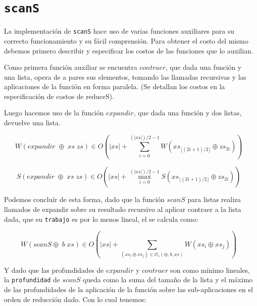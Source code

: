 \documentclass[a4paper,10pt]{article}
\begin{document}
\bigskip


\section*{\texttt{scanS}}

    La implementación de \texttt{scanS} hace uso de varias funciones auxiliares
para su correcto funcionamiento y su fácil comprensión. Para obtener el costo del
mismo debemos primero describir y especificar los costos de las funciones que lo 
auxilian.

    Como primera función auxiliar se encuentra $contraer$, que dada una función y
una lista, opera de a pares sus elementos, tomando las llamadas recursivas y las 
aplicaciones de la función en forma paralela. (Se detallan los costos en la
especificación de costos de reduceS).

\smallskip

    Luego hacemos uso de la función $expandir$, que dada una función y dos listas,
devuelve una lista. 

\begin{equation*}
    W \left( expandir \;\oplus \;xs \;zs \right) \in
    O \left( \vert xs \vert + \sum_{i=0}^{(\vert xs \vert)/2 - 1} W \left( xs_{\lfloor (2i+1)/2 \rfloor} \oplus zs_{2i} \right) \right)
\end{equation*}

\begin{equation*}
    S \left( expandir \;\oplus \;xs \;zs \right) \in
    O \left( \vert xs \vert + \max_{i=0}^{(\vert xs \vert)/2 - 1} S \left( xs_{\lfloor (2i+1)/2 \rfloor} \oplus zs_{2i} \right) \right)
\end{equation*}

\bigskip

    Podemos concluír de esta forma, dado que la función $scanS$ para listas realiza
llamados de expandir sobre su resultado recursivo al aplicar contraer a la lista
dada, que su \texttt{trabajo} es por lo menos lineal, el se calcula como:

\begin{equation*}
    W \left( scanS \oplus \; b \; xs \right) \in
    O \left( \vert xs \vert + \sum_{(xs_i \oplus xs_j) \in \mathcal{O}_s(\oplus,b,xs)} W \left( xs_i \oplus xs_j \right) \right)
\end{equation*}

    Y dado que las profundidades de $expandir$ y $contraer$ son como mínimo lineales,
la \texttt{profundidad} de $scanS$ queda como la suma del tamaño de la lista y el
máximo de las profundidades de la aplicación de la función sobre las sub-aplicaciones
en el orden de reducción dado. Con lo cual tenemos:
\end{document}

